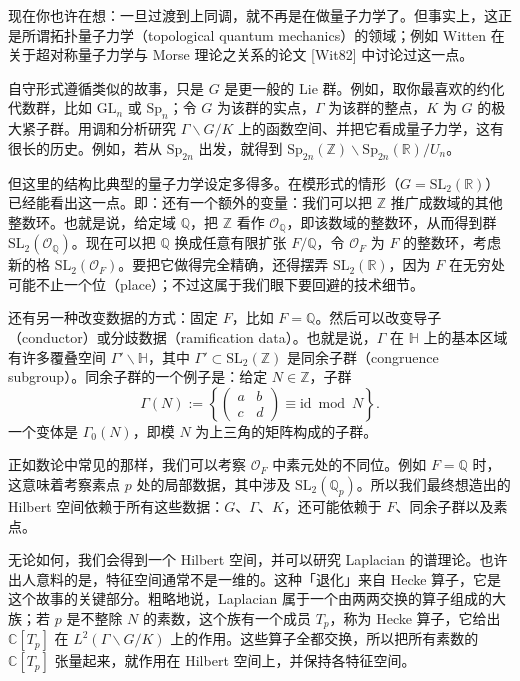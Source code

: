 现在你也许在想：一旦过渡到上同调，就不再是在做量子力学了。但事实上，这正是所谓拓扑量子力学（topological quantum mechanics）的领域；例如 Witten 在关于超对称量子力学与 Morse 理论之关系的论文 [Wit82] 中讨论过这一点。

自守形式遵循类似的故事，只是 $G$ 是更一般的 Lie 群。例如，取你最喜欢的约化代数群，比如 $\mathrm{GL}_n$ 或 $\mathrm{Sp}_n$；令 $G$ 为该群的实点，$\Gamma$ 为该群的整点，$K$ 为 $G$ 的极大紧子群。用调和分析研究 $\Gamma\backslash G/K$ 上的函数空间、并把它看成量子力学，这有很长的历史。例如，若从 $\mathrm{Sp}_{2n}$ 出发，就得到 $\mathrm{Sp}_{2n}(\mathbb{Z})\backslash\mathrm{Sp}_{2n}(\mathbb{R})/U_n$。

但这里的结构比典型的量子力学设定多得多。在模形式的情形（$G=\mathrm{SL}_2(\mathbb{R})$）已经能看出这一点。即：还有一个额外的变量：我们可以把 $\mathbb{Z}$ 推广成数域的其他整数环。也就是说，给定域 $\mathbb{Q}$，把 $\mathbb{Z}$ 看作 $\mathcal{O}_{\mathbb{Q}}$，即该数域的整数环，从而得到群 $\mathrm{SL}_2(\mathcal{O}_{\mathbb{Q}})$。现在可以把 $\mathbb{Q}$ 换成任意有限扩张 $F/\mathbb{Q}$，令 $\mathcal{O}_F$ 为 $F$ 的整数环，考虑新的格 $\mathrm{SL}_2(\mathcal{O}_F)$。要把它做得完全精确，还得摆弄 $\mathrm{SL}_2(\mathbb{R})$，因为 $F$ 在无穷处可能不止一个位（place）；不过这属于我们眼下要回避的技术细节。

还有另一种改变数据的方式：固定 $F$，比如 $F=\mathbb{Q}$。然后可以改变导子（conductor）或分歧数据（ramification data）。也就是说，$\Gamma$ 在 $\mathbb{H}$ 上的基本区域有许多覆叠空间 $\Gamma'\backslash\mathbb{H}$，其中 $\Gamma'\subset\mathrm{SL}_2(\mathbb{Z})$ 是同余子群（congruence subgroup）。同余子群的一个例子是：给定 $N\in\mathbb{Z}$，子群
\[
\Gamma(N) := \left\{ \begin{pmatrix} a & b \\ c & d \end{pmatrix} \equiv \mathrm{id} \bmod N \right\}.
\]
一个变体是 $\Gamma_0(N)$，即模 $N$ 为上三角的矩阵构成的子群。


正如数论中常见的那样，我们可以考察 $\mathcal{O}_F$ 中素元处的不同位。例如 $F=\mathbb{Q}$ 时，这意味着考察素点 $p$ 处的局部数据，其中涉及 $\mathrm{SL}_2(\mathbb{Q}_p)$。所以我们最终想造出的 Hilbert 空间依赖于所有这些数据：$G$、$\Gamma$、$K$，还可能依赖于 $F$、同余子群以及素点。

无论如何，我们会得到一个 Hilbert 空间，并可以研究 Laplacian 的谱理论。也许出人意料的是，特征空间通常不是一维的。这种「退化」来自 Hecke 算子，它是这个故事的关键部分。粗略地说，Laplacian 属于一个由两两交换的算子组成的大族；若 $p$ 是不整除 $N$ 的素数，这个族有一个成员 $T_p$，称为 Hecke 算子，它给出 $\mathbb{C}[T_p]$ 在 $L^2(\Gamma\backslash G/K)$ 上的作用。这些算子全都交换，所以把所有素数的 $\mathbb{C}[T_p]$ 张量起来，就作用在 Hilbert 空间上，并保持各特征空间。

